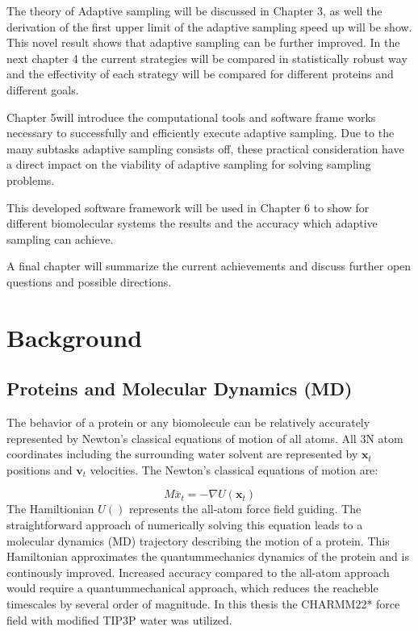 The theory of Adaptive sampling will be discussed in Chapter 3, as well the derivation of the first upper limit of the adaptive sampling speed up will be show. This novel result shows that adaptive sampling can be further improved. 
In the next chapter 4 the current strategies will be compared in statistically robust way and the effectivity of each strategy will be compared for different proteins and different goals.

Chapter 5will introduce the computational tools and software frame works necessary to successfully and efficiently execute adaptive sampling. Due to the many subtasks adaptive sampling consists off, these practical consideration have a direct impact on the viability of adaptive sampling for solving sampling problems.

This developed software framework will be used in Chapter 6 to show for different biomolecular systems the results and the accuracy which adaptive sampling can achieve. 

A final chapter will summarize the current achievements and discuss further open questions and possible directions.


\afterpage{\null\newpage}
\chapter{Background\label{sec:background}}

\section{Proteins and Molecular Dynamics (MD)}

The behavior of a protein or any biomolecule can be relatively accurately represented by Newton's classical equations of motion of all atoms. All 3N atom coordinates including the surrounding water solvent are represented by $\mathbf{x}_{t}$ positions and $\mathbf{v}_{t}$ velocities. The Newton's classical equations of motion are:

$$M\ddot{x_{t}}=-\nabla U(\mathbf{x}_{t})$$
The Hamiltionian $U()$ represents the all-atom force field guiding. The straightforward approach of numerically solving this equation leads to a molecular dynamics (MD) trajectory describing the motion of a protein. This Hamiltonian approximates the quantummechanics dynamics of the protein and is continously improved. Increased accuracy compared to the all-atom approach would require a quantummechanical approach, which reduces the reacheble timescales by several order of magnitude.  In this thesis the CHARMM22* force field \cite{Charmm22star} with modified TIP3P water was utilized.

